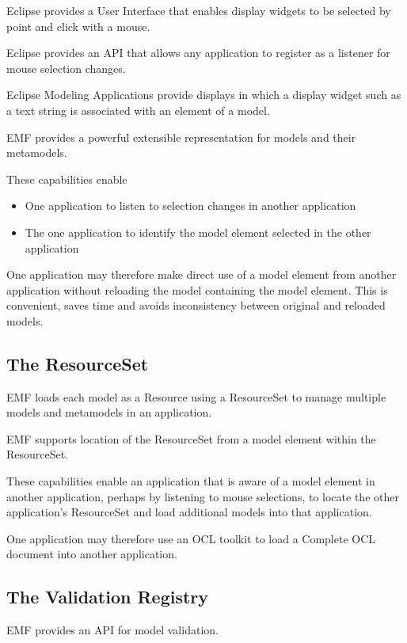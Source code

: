 \documentclass[a4paper]{article}
\begin{document}
Eclipse provides a User Interface that enables display widgets to be selected by point and click with a mouse.

Eclipse provides an API that allows any application to register as a listener for mouse selection changes.

Eclipse Modeling Applications provide displays in which a display widget such as a text string is associated with an element of a model.

EMF provides a powerful extensible representation for models and their metamodels.

These capabilities enable

\begin{itemize}
\item One application to listen to selection changes in another application
\item The one application to identify the model element selected in the other application
\end{itemize}

One application may therefore make direct use of a model element from another application without reloading the model containing the model element. This is convenient, saves time and avoids inconsistency between original and reloaded models.

\subsection{The ResourceSet}\label{ResourceSet}

EMF loads each model as a Resource using a ResourceSet to manage multiple models and metamodels in an application.

EMF supports location of the ResourceSet from a model element within the ResourceSet.

These capabilities enable an application that is aware of a model element in another application, perhaps by listening to mouse selections, to locate the other application's ResourceSet and load additional models into that application.

One application may therefore use an OCL toolkit to load a Complete OCL document into another application.

\subsection{The Validation Registry}

EMF provides an API for model validation.
\end{document}
